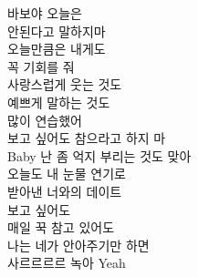 \documentclass{oblivoir}
\begin{document}
바보야 오늘은\\
안된다고 말하지마\\
오늘만큼은 내게도\\
꼭 기회를 줘\\
사랑스럽게 웃는 것도\\
예쁘게 말하는 것도\\
많이 연습했어\\
보고 싶어도 참으라고 하지 마\\

Baby 난 좀 억지 부리는 것도 맞아\\
오늘도 내 눈물 연기로\\
받아낸 너와의 데이트\\
보고 싶어도\\
매일 꾹 참고 있어도\\
나는 네가 안아주기만 하면\\
사르르르르 녹아 Yeah
\end{document}
